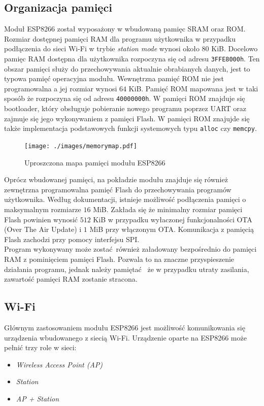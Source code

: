 \subsection{Organizacja pamięci}
\label{pamiec}
Moduł ESP8266 został wyposażony w wbudowaną pamięc SRAM oraz ROM. Rozmiar dostępnej
pamięci RAM dla programu użytkownika w przypadku podłączenia do sieci Wi-Fi w trybie
\textit{station mode} wynosi około $\num{80}$ KiB. Docelowo 
pamięc RAM dostępna dla użytkownika rozpoczyna się od adresu \texttt{3FFE8000h}.
Ten obszar pamięci służy do przechowywania aktualnie obrabianych danych, jest to typowa 
pamięć operacyjna modułu.
Wewnętrzna pamięć ROM nie jest programowalna a jej rozmiar wynosi $\num{64}$ KiB.
Pamięć ROM mapowana jest w taki sposób że rozpoczyna się od adresu \texttt{40000000h}.
W pamięci ROM znajduje się bootloader, który obsługuje pobieranie nowego programu poprzez
UART oraz zajmuje się jego wykonywaniem z pamięci Flash. W pamięci ROM znajujde się także 
implementacja podstawowych funkcji systemowych typu \texttt{alloc} czy \texttt{memcpy}.

\begin{figure}[H]
    \texttt{[image: ./images/memorymap.pdf]}
    \caption{Uproszczona mapa pamięci modułu ESP8266}
	\label{memmap}
\end{figure}

Oprócz wbudowanej pamięci, na pokładzie modułu znajduje się również zewnętrzna programowalna
pamięć Flash do przechowywania programów użytkownika. Według dokumentacji, istnieje
możliwość podłączenia pamięci o maksymalnym rozmiarze $\num{16}$ MiB. Zakłada się 
że minimalny rozmiar pamięci Flash powinien wynosić $\num{512}$ KiB w przypadku wyłaczonej
funkcjonalności OTA (Over The Air Update) i $\num{1}$ MiB przy włączonym OTA. Komunikacja
z pamięcią Flash zachodzi przy pomocy interfejsu SPI.\\

Program wykonywany może zostać również załadowany bezpośrednio do pamięci RAM z pominięciem 
pamięci Flash. Pozwala to na znaczne przyspieszenie działania programu, jednak należy pamiętać 
że w przypadku utraty zasilania, zawartość pamięci RAM zostanie stracona.

\subsection{Wi-Fi}
\label{wifi}
Głównym zastosowaniem modułu ESP8266 jest możliwość komunikowania się urządzenia wbudowanego
z siecią Wi-Fi. Urządzenie oparte na ESP8266 może pełnić trzy role w sieci:\\
\begin{itemize}
    \item \textit{Wireless Access Point (AP)}
    \item \textit{Station}
    \item \textit{AP + Station}\\
\end{itemize}

